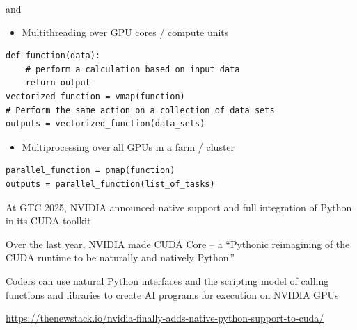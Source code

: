 \begin{frame}[fragile]

     and 

    \vspace{0.5em}
    \begin{itemize}
        \item Multithreading over GPU cores / compute units 
    \end{itemize}
    
    \begin{verbatim}
def function(data):
    # perform a calculation based on input data
    return output
vectorized_function = vmap(function)  
# Perform the same action on a collection of data sets
outputs = vectorized_function(data_sets)   
    \end{verbatim}

    \vspace{0.5em}
    \vspace{0.5em}
    \begin{itemize}
        \item Multiprocessing over all GPUs in a farm / cluster 
    \end{itemize}

    \begin{verbatim}
parallel_function = pmap(function)  
outputs = parallel_function(list_of_tasks)  
    \end{verbatim}

\end{frame}

\begin{frame}

    \textbf{}
    
    \vspace{0.5em}
    At GTC 2025, NVIDIA announced native support and full integration of Python in its CUDA toolkit


    \vspace{0.5em}
    Over the last year, NVIDIA made CUDA Core -- a ``Pythonic
    reimagining of the CUDA runtime to be naturally and natively Python.''

    \vspace{0.5em}
    Coders can use natural Python interfaces and the scripting model of calling
    functions and libraries to create AI programs for execution on NVIDIA
    GPUs

    \vspace{0.5em}
    \vspace{0.5em}
    \vspace{0.5em}

    \footnotesize{
        \url{https://thenewstack.io/nvidia-finally-adds-native-python-support-to-cuda/}
    }

\end{frame}


